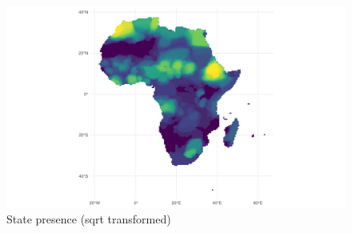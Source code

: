 \documentclass[12pt]{article}
\begin{document}
\begin{figure}[htpb]
	\centering
	\includegraphics[width=\linewidth]{../R/Output/sp_os_sum_any_plot.pdf}
	\caption{State presence (sqrt transformed)}
	\label{Sp}
\end{figure}
\end{document}
